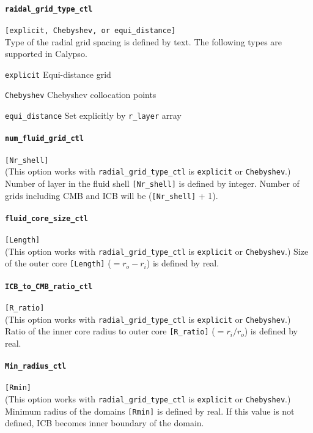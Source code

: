 \paragraph{\tt raidal\_grid\_type\_ctl}
\label{href_t:radial_grid_type_ctl}
\verb|[explicit, Chebyshev, or equi_distance]| \\
Type of the radial grid spacing is defined by text. The following types are supported in Calypso.
%
\begin{description}
	\item{\tt explicit}  Equi-distance grid
	\item{\tt Chebyshev} Chebyshev collocation points
	\item{\tt equi\_distance} Set explicitly by \verb|r_layer| array
\end{description}
%

\paragraph{\tt num\_fluid\_grid\_ctl}
\label{href_t:num_fluid_grid_ctl}
\verb|[Nr_shell]| \\
(This option works with \verb|radial_grid_type_ctl| is {\tt explicit} or {\tt Chebyshev}.)
Number of layer in the fluid shell \verb|[Nr_shell]| is defined by integer. Number of grids including CMB and ICB will be (\verb|[Nr_shell]| + 1).

\paragraph{\tt fluid\_core\_size\_ctl}
\label{href_t:fluid_core_size_ctl}
\verb|[Length]| \\
(This option works with \verb|radial_grid_type_ctl| is {\tt explicit} or {\tt Chebyshev}.)
Size of the outer core \verb|[Length]| ($ = r_{o}-r_{i}$) is defined by real.

\paragraph{\tt ICB\_to\_CMB\_ratio\_ctl}
\label{href_t:ICB_to_CMB_ratio_ctl} 
\verb|[R_ratio]| \\
(This option works with \verb|radial_grid_type_ctl| is {\tt explicit} or {\tt Chebyshev}.)
Ratio of the inner core radius to outer core \verb|[R_ratio]| ($ = r_{i} / r_{o}$) is defined by real.

\paragraph{\tt Min\_radius\_ctl}
\label{href_t:Min_radius_ctl}
\verb|[Rmin]| \\
(This option works with \verb|radial_grid_type_ctl| is {\tt explicit} or {\tt Chebyshev}.)
Minimum radius of the domains \verb|[Rmin]| is defined by real. If this value is not defined, ICB becomes inner boundary of the domain.

